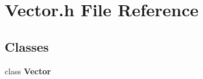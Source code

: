 \section{Vector.\-h File Reference}
\label{_vector_8h}
\subsection*{Classes}
\begin{DoxyCompactItemize}
\item 
class {\bf Vector}
\end{DoxyCompactItemize}
